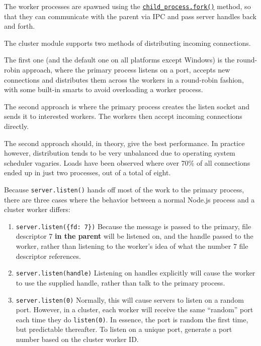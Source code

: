 The worker processes are spawned using the
\href{child_process.md\#child_processforkmodulepath-args-options}{\texttt{child\_process.fork()}}
method, so that they can communicate with the parent via IPC and pass
server handles back and forth.

The cluster module supports two methods of distributing incoming
connections.

The first one (and the default one on all platforms except Windows) is
the round-robin approach, where the primary process listens on a port,
accepts new connections and distributes them across the workers in a
round-robin fashion, with some built-in smarts to avoid overloading a
worker process.

The second approach is where the primary process creates the listen
socket and sends it to interested workers. The workers then accept
incoming connections directly.

The second approach should, in theory, give the best performance. In
practice however, distribution tends to be very unbalanced due to
operating system scheduler vagaries. Loads have been observed where over
70\% of all connections ended up in just two processes, out of a total
of eight.

Because \texttt{server.listen()} hands off most of the work to the
primary process, there are three cases where the behavior between a
normal Node.js process and a cluster worker differs:

\begin{enumerate}
\def\labelenumi{\arabic{enumi}.}
\tightlist
\item
  \texttt{server.listen(\{fd:\ 7\})} Because the message is passed to
  the primary, file descriptor 7 \textbf{in the parent} will be listened
  on, and the handle passed to the worker, rather than listening to the
  worker's idea of what the number 7 file descriptor references.
\item
  \texttt{server.listen(handle)} Listening on handles explicitly will
  cause the worker to use the supplied handle, rather than talk to the
  primary process.
\item
  \texttt{server.listen(0)} Normally, this will cause servers to listen
  on a random port. However, in a cluster, each worker will receive the
  same ``random'' port each time they do \texttt{listen(0)}. In essence,
  the port is random the first time, but predictable thereafter. To
  listen on a unique port, generate a port number based on the cluster
  worker ID.
\end{enumerate}

